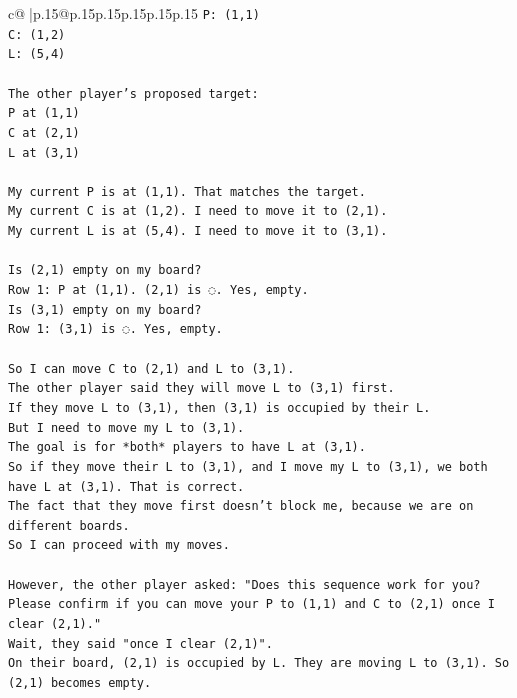 \documentclass{article}
\begin{document}
{\begin{supertabular}{c@{$\;$}|p{.15\linewidth}@{}p{.15\linewidth}p{.15\linewidth}p{.15\linewidth}p{.15\linewidth}p{.15\linewidth}}
{{{\texttt{P: (1,1)} \\
\texttt{C: (1,2)} \\
\texttt{L: (5,4)} \\
\\ 
\texttt{The other player's proposed target:} \\
\texttt{P at (1,1)} \\
\texttt{C at (2,1)} \\
\texttt{L at (3,1)} \\
\\ 
\texttt{My current P is at (1,1). That matches the target.} \\
\texttt{My current C is at (1,2). I need to move it to (2,1).} \\
\texttt{My current L is at (5,4). I need to move it to (3,1).} \\
\\ 
\texttt{Is (2,1) empty on my board?} \\
\texttt{Row 1: P at (1,1). (2,1) is ◌. Yes, empty.} \\
\texttt{Is (3,1) empty on my board?} \\
\texttt{Row 1: (3,1) is ◌. Yes, empty.} \\
\\ 
\texttt{So I can move C to (2,1) and L to (3,1).} \\
\texttt{The other player said they will move L to (3,1) first.} \\
\texttt{If they move L to (3,1), then (3,1) is occupied by their L.} \\
\texttt{But I need to move my L to (3,1).} \\
\texttt{The goal is for *both* players to have L at (3,1).} \\
\texttt{So if they move their L to (3,1), and I move my L to (3,1), we both have L at (3,1). That is correct.} \\
\texttt{The fact that they move first doesn't block me, because we are on different boards.} \\
\texttt{So I can proceed with my moves.} \\
\\ 
\texttt{However, the other player asked: "Does this sequence work for you? Please confirm if you can move your P to (1,1) and C to (2,1) once I clear (2,1)."} \\
\texttt{Wait, they said "once I clear (2,1)".} \\
\texttt{On their board, (2,1) is occupied by L. They are moving L to (3,1). So (2,1) becomes empty.} \\
}}}
\end{supertabular}}
\end{document}
